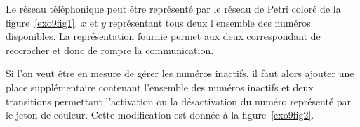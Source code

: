 Le réseau téléphonique peut être représenté par le réseau de Petri coloré de la
figure~\ref{exo9fig1}. $x$ et $y$ représentant tous deux l'ensemble des numéros disponibles. La
représentation fournie permet aux deux correspondant de reccrocher et donc de rompre la
communication. 

Si l'on veut être en mesure de gérer les numéros inactifs, il faut alors ajouter une place
supplémentaire contenant l'ensemble des numéros inactifs et deux transitions permettant l'activation
ou la désactivation du numéro représenté par le jeton de couleur. Cette modification est donnée à la
figure~\ref{exo9fig2}.

